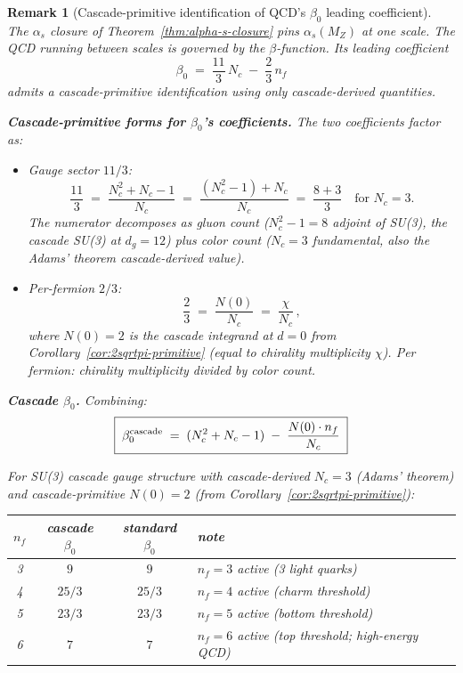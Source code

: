 \documentclass[12pt,a4paper]{article}
\newtheorem*{remark}{Remark}
\begin{document}
\begin{remark}[Cascade-primitive identification of QCD's $\beta_0$ leading coefficient]\label{rem:cascade-beta0}
The $\alpha_s$ closure of Theorem~\ref{thm:alpha-s-closure} pins
$\alpha_s(M_Z)$ at one scale. The QCD running between scales is
governed by the $\beta$-function. Its leading coefficient
\[
\beta_0 \;=\; \frac{11}{3}\,N_c \;-\; \frac{2}{3}\,n_f
\]
admits a cascade-primitive identification using only cascade-derived
quantities.

\medskip\noindent\textbf{Cascade-primitive forms for $\beta_0$'s
coefficients.} The two coefficients factor as:
\begin{itemize}[nosep]
\item \emph{Gauge sector $11/3$:}
\[
\frac{11}{3} \;=\; \frac{N_c^2 + N_c - 1}{N_c}
\;=\; \frac{(N_c^2 - 1) + N_c}{N_c}
\;=\; \frac{8 + 3}{3} \quad\text{for $N_c = 3$.}
\]
The numerator decomposes as gluon count ($N_c^2 - 1 = 8$ adjoint
of SU(3), the cascade SU(3) at $d_g = 12$) plus color count
($N_c = 3$ fundamental, also the Adams' theorem cascade-derived value).
\item \emph{Per-fermion $2/3$:}
\[
\frac{2}{3} \;=\; \frac{N(0)}{N_c}
\;=\; \frac{\chi}{N_c}\,,
\]
where $N(0) = 2$ is the cascade integrand at $d=0$ from
Corollary~\ref{cor:2sqrtpi-primitive} (equal to chirality
multiplicity $\chi$). Per fermion: chirality multiplicity divided
by color count.
\end{itemize}

\medskip\noindent\textbf{Cascade $\beta_0$.} Combining:
\[
\boxed{\;\beta_0^{\rm cascade} \;=\; (N_c^2 + N_c - 1) \;-\; \frac{N(0)\cdot n_f}{N_c}\;}
\]

For SU(3) cascade gauge structure with cascade-derived $N_c = 3$
(Adams' theorem) and cascade-primitive $N(0) = 2$ (from
Corollary~\ref{cor:2sqrtpi-primitive}):
\begin{center}
\renewcommand{\arraystretch}{1.15}
\begin{tabular}{cccl}
\toprule
$n_f$ & cascade $\beta_0$ & standard $\beta_0$ & note \\
\midrule
3 & $9$    & $9$    & $n_f = 3$ active (3 light quarks) \\
4 & $25/3$ & $25/3$ & $n_f = 4$ active (charm threshold) \\
5 & $23/3$ & $23/3$ & $n_f = 5$ active (bottom threshold) \\
6 & $7$    & $7$    & $n_f = 6$ active (top threshold; high-energy QCD) \\
\bottomrule
\end{tabular}
\end{center}


\end{remark}
\end{document}
